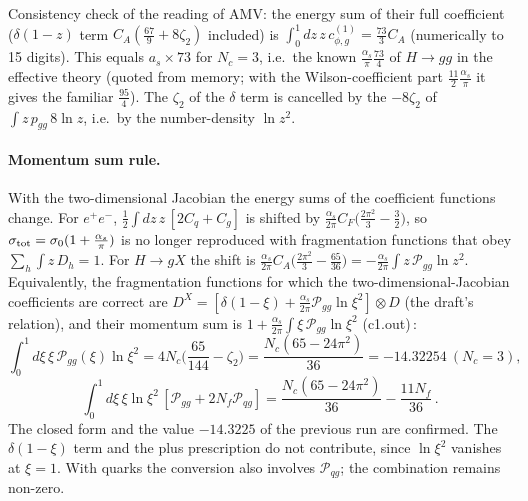 Consistency check of the reading of AMV: the energy sum of their full coefficient ($\delta(1-z)$ term $C_A(\frac{67}{9}+8\zeta_2)$ included) is $\int_0^1dz\,z\,c^{(1)}_{\phi,g}=\frac{73}{3}C_A$ (numerically to 15 digits). This equals $a_s\times73$ for $N_c=3$, i.e.\ the known $\frac{\alpha_s}{\pi}\frac{73}{4}$ of $H\to gg$ in the effective theory (quoted from memory; with the Wilson-coefficient part $\frac{11}{2}\frac{\alpha_s}{\pi}$ it gives the familiar $\frac{95}{4}$). The $\zeta_2$ of the $\delta$ term is cancelled by the $-8\zeta_2$ of $\int z\,p_{gg}\,8\ln z$, i.e.\ by the number-density $\ln z^2$.

\paragraph{Momentum sum rule.} With the two-dimensional Jacobian the energy sums of the coefficient functions change. For $e^+e^-$, $\frac12\int dz\,z\,[2C_q+C_g]$ is shifted by $\frac{\alpha_s}{2\pi}C_F\big(\frac{2\pi^2}{3}-\frac32\big)$, so $\sigma_{\rm tot}=\sigma_0(1+\frac{\alpha_s}{\pi})$ is no longer reproduced with fragmentation functions that obey $\sum_h\int z\,D_h=1$. For $H\to gX$ the shift is $\frac{\alpha_s}{2\pi}C_A\big(\frac{2\pi^2}{3}-\frac{65}{36}\big)=-\frac{\alpha_s}{2\pi}\int z\,\mathcal P_{gg}\ln z^2$. Equivalently, the fragmentation functions for which the two-dimensional-Jacobian coefficients are correct are $D^{X}=[\delta(1-\xi)+\frac{\alpha_s}{2\pi}\mathcal P_{gg}\ln\xi^2]\otimes D$ (the draft's relation), and their momentum sum is $1+\frac{\alpha_s}{2\pi}\int\xi\,\mathcal P_{gg}\ln\xi^2$ (c1.out)\,:
\[
\int_0^1d\xi\,\xi\,\mathcal P_{gg}(\xi)\ln\xi^2=4N_c\Big(\frac{65}{144}-\zeta_2\Big)=\frac{N_c(65-24\pi^2)}{36}=-14.32254\ (N_c=3),
\]
\[
\int_0^1d\xi\,\xi\ln\xi^2\,[\mathcal P_{gg}+2N_f\mathcal P_{qg}]=\frac{N_c(65-24\pi^2)}{36}-\frac{11N_f}{36}\,.
\]
The closed form and the value $-14.3225$ of the previous run are confirmed. The $\delta(1-\xi)$ term and the plus prescription do not contribute, since $\ln\xi^2$ vanishes at $\xi=1$. With quarks the conversion also involves $\mathcal P_{qg}$; the combination remains non-zero.

